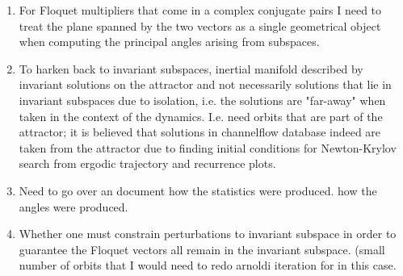 \begin{description}
{\begin{enumerate}
  \item
For Floquet multipliers that come in a complex conjugate pairs I need to treat
the plane spanned by the two vectors as a single geometrical object when computing the
principal angles arising from subspaces.

  \item
To harken back to invariant subspaces, inertial manifold described by invariant solutions
on the attractor and not necessarily solutions that lie in invariant subspaces due to isolation, i.e.
the solutions are "far-away" when taken in the context of the dynamics.
I.e. need orbits that are part of the attractor; it is believed that solutions in
channelflow database indeed are taken from the attractor due to
finding initial conditions for Newton-Krylov search from ergodic trajectory and recurrence plots.

  \item
Need to go over an document how the statistics were produced. how the angles were produced.

  \item
Whether one must constrain perturbations to invariant subspace in order to guarantee the Floquet vectors
all remain in the invariant subspace. (small number of orbits that I would need to redo arnoldi iteration for in
this case.

\end{enumerate}

}



\end{description}
